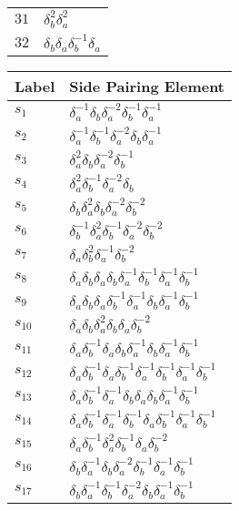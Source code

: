 \documentclass{article}
\begin{document}
\begin{center}
\begin{tabular}{ll}
$31$ & $\delta_b^{2}\delta_a^{2}$ \\
$32$ & $\delta_b^{}\delta_a^{}\delta_b^{-1}\delta_a^{}$ \\
\bottomrule
\end{tabular}
\hfill
\begin{tabular}{ll}
\toprule
Label & Side Pairing Element\\
\midrule
$s_{1}$ & $\delta_a^{-1}\delta_b^{}\delta_a^{-2}\delta_b^{-1}\delta_a^{-1}$ \\
$s_{2}$ & $\delta_a^{-1}\delta_b^{-1}\delta_a^{-2}\delta_b^{}\delta_a^{-1}$ \\
$s_{3}$ & $\delta_a^{2}\delta_b^{}\delta_a^{-2}\delta_b^{-1}$ \\
$s_{4}$ & $\delta_a^{2}\delta_b^{-1}\delta_a^{-2}\delta_b^{}$ \\
$s_{5}$ & $\delta_b^{}\delta_a^{2}\delta_b^{}\delta_a^{-2}\delta_b^{-2}$ \\
$s_{6}$ & $\delta_b^{-1}\delta_a^{2}\delta_b^{-1}\delta_a^{-2}\delta_b^{-2}$ \\
$s_{7}$ & $\delta_a^{}\delta_b^{2}\delta_a^{-1}\delta_b^{-2}$ \\
$s_{8}$ & $\delta_a^{}\delta_b^{}\delta_a^{}\delta_b^{}\delta_a^{-1}\delta_b^{-1}\delta_a^{-1}\delta_b^{-1}$ \\
$s_{9}$ & $\delta_a^{}\delta_b^{}\delta_a^{}\delta_b^{-1}\delta_a^{-1}\delta_b^{}\delta_a^{-1}\delta_b^{-1}$ \\
$s_{10}$ & $\delta_a^{}\delta_b^{}\delta_a^{2}\delta_b^{}\delta_a^{}\delta_b^{-2}$ \\
$s_{11}$ & $\delta_a^{}\delta_b^{-1}\delta_a^{}\delta_b^{}\delta_a^{-1}\delta_b^{}\delta_a^{-1}\delta_b^{-1}$ \\
$s_{12}$ & $\delta_a^{}\delta_b^{-1}\delta_a^{}\delta_b^{-1}\delta_a^{-1}\delta_b^{-1}\delta_a^{-1}\delta_b^{-1}$ \\
$s_{13}$ & $\delta_a^{}\delta_b^{-1}\delta_a^{-1}\delta_b^{}\delta_a^{}\delta_b^{}\delta_a^{-1}\delta_b^{-1}$ \\
$s_{14}$ & $\delta_a^{}\delta_b^{-1}\delta_a^{-1}\delta_b^{-1}\delta_a^{}\delta_b^{-1}\delta_a^{-1}\delta_b^{-1}$ \\
$s_{15}$ & $\delta_a^{}\delta_b^{-1}\delta_a^{2}\delta_b^{-1}\delta_a^{}\delta_b^{-2}$ \\
$s_{16}$ & $\delta_b^{}\delta_a^{-1}\delta_b^{}\delta_a^{-2}\delta_b^{-1}\delta_a^{-1}\delta_b^{-1}$ \\
$s_{17}$ & $\delta_b^{}\delta_a^{-1}\delta_b^{-1}\delta_a^{-2}\delta_b^{}\delta_a^{-1}\delta_b^{-1}$ \\

\end{tabular}
\end{center}
\end{document}
